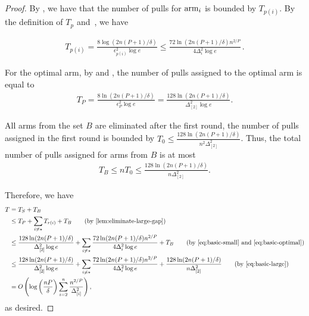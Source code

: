 \begin{proof}
    By , we have that the number of pulls for \(\textnormal{arm}_{i}\) is bounded by \(T_{p(i)}\). By the definition of \(T_{p}\) and~, we have

    \begin{align}\label{eq:basic-small}
        T_{p(i)} = \frac{8 \log(2 n (P + 1) / \delta)}{\epsilon^2_{p(i)} \log e} \le \frac{72 \ln (2 n (P + 1) / \delta) n^{2/P}}{4 \Delta^2_i \log e}\,.
    \end{align} 
    
    For the optimal arm, by  and , the number of pulls assigned to the optimal arm is equal to
    \begin{align}\label{eq:basic-optimal}
        T_{P} = \frac{8 \ln (2 n (P + 1) / \delta)}{\epsilon^2_{P} \log e} = \frac{128 \ln (2 n (P + 1) / \delta)}{\Delta_{[2]}^2 \log e}.
    \end{align}

    All arms from the set \(B\) are eliminated after the first round, the number of pulls assigned in the first round is bounded by \(T_0 \le \frac{128 \ln (2 n (P + 1) / \delta)}{n^2\Delta_{[2]}^2}\). Thus, the total number of pulls assigned for arms from \(B\) is at most 
    \begin{align}\label{eq:basic-large}
        T_B \leq nT_0 \le \frac{128 \ln (2 n (P + 1) / \delta)}{n\Delta_{[2]}^2}.
    \end{align}

    Therefore, we have 
    \begin{align*}
    	T &= T_{S}+T_{B}\\
    	  &\leq T_{P} + \sum_{i\neq \star} T_{r(i)} + T_{B} \tag{by \Cref{lem:eliminate-large-gap}}\\
    	  &\leq \frac{128 \ln (2 n (P + 1) / \delta)}{\Delta_{[2]}^2 \log e} + \sum_{i\neq \star} \frac{72 \ln (2 n (P + 1) / \delta) n^{2/P}}{4 \Delta^2_i \log e} + T_{B} \tag{by \Cref{eq:basic-small} and \Cref{eq:basic-optimal}}\\
    	  &\leq \frac{128 \ln (2 n (P + 1) / \delta)}{\Delta_{[2]}^2 \log e} + \sum_{i\neq \star} \frac{72 \ln (2 n (P + 1) / \delta) n^{2/P}}{4 \Delta^2_i \log e} + \frac{128 \ln (2 n (P + 1) / \delta)}{n\Delta_{[2]}^2} \tag{by \Cref{eq:basic-large}}\\
    	  & = O\left(\log \left(\frac{nP}{\delta} \right) \sum_{i =2}^n \frac{n^{2/P}}{\Delta^2_{[i]}}\right),
    \end{align*}
    as desired.
\end{proof}

